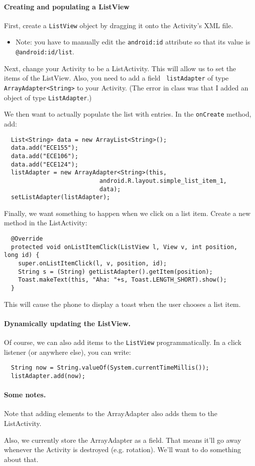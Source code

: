 \paragraph{Creating and populating a ListView} 
First, create a {\tt ListView} object by dragging it onto the Activity's
XML file.
\begin{itemize}
\item Note: you have to manually edit the {\tt android:id} attribute so
that its value is \verb+@android:id/list+.
\end{itemize}
Next, change your Activity to be a ListActivity. This will allow us to
set the items of the ListView. Also, you need to add a field {\tt
  listAdapter} of type \verb+ArrayAdapter<String>+ to your Activity.
(The error in class was that I added an object of type {\tt ListAdapter}.)

We then want to actually populate the list with entries. In the 
{\tt onCreate} method, add:
\begin{verbatim}
  List<String> data = new ArrayList<String>();
  data.add("ECE155");
  data.add("ECE106");
  data.add("ECE124");
  listAdapter = new ArrayAdapter<String>(this,
                           android.R.layout.simple_list_item_1,
                           data);
  setListAdapter(listAdapter);
\end{verbatim}

Finally, we want something to happen when we click on a list item.
Create a new method in the ListActivity:
\begin{verbatim}
  @Override
  protected void onListItemClick(ListView l, View v, int position, long id) {
    super.onListItemClick(l, v, position, id);
    String s = (String) getListAdapter().getItem(position);
    Toast.makeText(this, "Aha: "+s, Toast.LENGTH_SHORT).show();
  }
\end{verbatim}
This will cause the phone to display a toast when the user chooses a list item.

\paragraph{Dynamically updating the ListView.} Of course, we can also
add items to the {\tt ListView} programmatically. In a click listener (or
anywhere else), you can write:
\begin{verbatim}
  String now = String.valueOf(System.currentTimeMillis());
  listAdapter.add(now);
\end{verbatim}

\paragraph{Some notes.} Note that adding elements to the ArrayAdapter also adds them to the ListActivity.

Also, we currently store the ArrayAdapter as a field.
That means it'll go away whenever the Activity is destroyed (e.g.
rotation). We'll want to do something about that.



